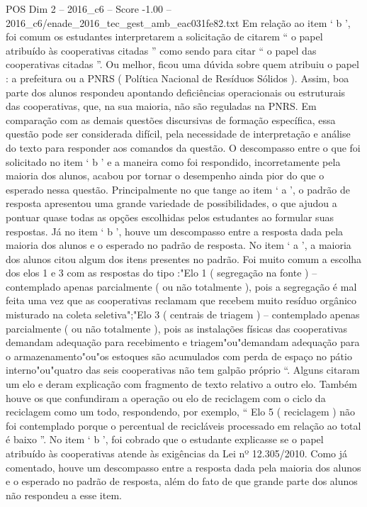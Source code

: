 \begin{textsample}{POS Dim 2 – 2016\_c6 – Score -1.00 – 2016\_c6/enade\_2016\_tec\_gest\_amb\_eac031fe82.txt}
Em relação ao item ‘ b ’, foi comum os estudantes interpretarem a solicitação de citarem “ o papel atribuído às cooperativas citadas ” como sendo para citar “ o papel das cooperativas citadas ”.
Ou melhor, ficou uma dúvida sobre quem atribuiu o papel : a prefeitura ou a PNRS ( Política Nacional de Resíduos Sólidos ).
Assim, boa parte dos alunos respondeu apontando deficiências operacionais ou estruturais das cooperativas, que, na sua maioria, não são reguladas na PNRS.
Em comparação com as demais questões discursivas de formação específica, essa questão pode ser considerada difícil, pela necessidade de interpretação e análise do texto para responder aos comandos da questão.
O descompasso entre o que foi solicitado no item ‘ b ’ e a maneira como foi respondido, incorretamente pela maioria dos alunos, acabou por tornar o desempenho ainda pior do que o esperado nessa questão.
Principalmente no que tange ao item ‘ a ’, o padrão de resposta apresentou uma grande variedade de possibilidades, o que ajudou a pontuar quase todas as opções escolhidas pelos estudantes ao formular suas respostas.
Já no item ‘ b ’, houve um descompasso entre a resposta dada pela maioria dos alunos e o esperado no padrão de resposta.
No item ‘ a ’, a maioria dos alunos citou algum dos itens presentes no padrão.
Foi muito comum a escolha dos elos 1 e 3 com as respostas do tipo :"Elo 1 ( segregação na fonte ) – contemplado apenas parcialmente ( ou não totalmente ), pois a segregação é mal feita uma vez que as cooperativas reclamam que recebem muito resíduo orgânico misturado na coleta seletiva";"Elo 3 ( centrais de triagem ) – contemplado apenas parcialmente ( ou não totalmente ), pois as instalações físicas das cooperativas demandam adequação para recebimento e triagem"ou"demandam adequação para o armazenamento"ou"os estoques são acumulados com perda de espaço no pátio interno"ou"quatro das seis cooperativas não tem galpão próprio “.
Alguns citaram um elo e deram explicação com fragmento de texto relativo a outro elo.
Também houve os que confundiram a operação ou elo de reciclagem com o ciclo da reciclagem como um todo, respondendo, por exemplo, “ Elo 5 ( reciclagem ) não foi contemplado porque o percentual de recicláveis processado em relação ao total é baixo ”.
No item ‘ b ’, foi cobrado que o estudante explicasse se o papel atribuído às cooperativas atende às exigências da Lei nº 12.305/2010.
Como já comentado, houve um descompasso entre a resposta dada pela maioria dos alunos e o esperado no padrão de resposta, além do fato de que grande parte dos alunos não respondeu a esse item.

\end{textsample}
